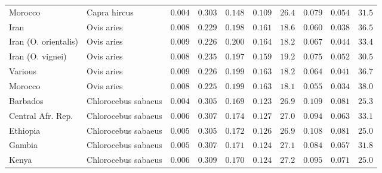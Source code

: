 \documentclass{article}
\begin{document}
\begin{center}
\begin{longtable}{|l|l|r|r|r|r|r|r|r|r|}
            Morocco &         Capra hircus &               $ 0.004$ &                $ 0.303$ &        $ 0.148$ &              $ 0.109$ &           $  26.4$ & $ 0.079$ &     $ 0.054$ &  $  31.5$ \\
            Iran &           Ovis aries &               $ 0.008$ &                $ 0.229$ &        $ 0.198$ &              $ 0.161$ &           $  18.6$ & $ 0.060$ &     $ 0.038$ &  $  36.5$ \\
            Iran (O. orientalis) &           Ovis aries &               $ 0.009$ &                $ 0.226$ &        $ 0.200$ &              $ 0.164$ &           $  18.2$ & $ 0.067$ &     $ 0.044$ &  $  33.4$ \\
            Iran (O. vignei) &           Ovis aries &               $ 0.008$ &                $ 0.235$ &        $ 0.197$ &              $ 0.159$ &           $  19.2$ & $ 0.075$ &     $ 0.052$ &  $  30.5$ \\
            Various &           Ovis aries &               $ 0.009$ &                $ 0.226$ &        $ 0.199$ &              $ 0.163$ &           $  18.2$ & $ 0.064$ &     $ 0.041$ &  $  36.7$ \\
            Morocco &           Ovis aries &               $ 0.008$ &                $ 0.225$ &        $ 0.199$ &              $ 0.163$ &           $  18.1$ & $ 0.055$ &     $ 0.034$ &  $  38.0$ \\
            Barbados &  Chlorocebus sabaeus &               $ 0.004$ &                $ 0.305$ &        $ 0.169$ &              $ 0.123$ &           $  26.9$ & $ 0.109$ &     $ 0.081$ &  $  25.3$ \\
            Central Afr. Rep. &  Chlorocebus sabaeus &               $ 0.006$ &                $ 0.307$ &        $ 0.174$ &              $ 0.127$ &           $  27.0$ & $ 0.094$ &     $ 0.063$ &  $  33.1$ \\
            Ethiopia &  Chlorocebus sabaeus &               $ 0.005$ &                $ 0.305$ &        $ 0.172$ &              $ 0.126$ &           $  26.9$ & $ 0.108$ &     $ 0.081$ &  $  25.0$ \\
            Gambia &  Chlorocebus sabaeus &               $ 0.005$ &                $ 0.307$ &        $ 0.171$ &              $ 0.124$ &           $  27.1$ & $ 0.084$ &     $ 0.057$ &  $  31.8$ \\
            Kenya &  Chlorocebus sabaeus &               $ 0.006$ &                $ 0.309$ &        $ 0.170$ &              $ 0.124$ &           $  27.2$ & $ 0.095$ &     $ 0.071$ &  $  25.0$ \\

\end{longtable}
\end{center}
\end{document}
